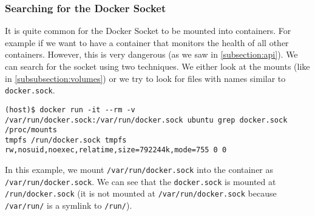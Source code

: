\subsubsection{Searching for the Docker Socket}
It is quite common for the Docker Socket to be mounted into containers. For example if we want to have a container that monitors the health of all other containers. However, this is very dangerous (as we saw in \autoref{subsection:api}). We can search for the socket using two techniques. We either look at the mounts (like in \autoref{subsubsection:volumes}) or we try to look for files with names similar to \lstinline{docker.sock}.

\begin{lstlisting}[caption={\lstinline{docker.sock} in \lstinline{/proc/mounts}.},captionpos=b]
(host)$ docker run -it --rm -v /var/run/docker.sock:/var/run/docker.sock ubuntu grep docker.sock /proc/mounts
tmpfs /run/docker.sock tmpfs rw,nosuid,noexec,relatime,size=792244k,mode=755 0 0
\end{lstlisting}

In this example, we mount \lstinline{/var/run/docker.sock} into the container as \lstinline{/var/run/docker.sock}. We can see that the \lstinline{docker.sock} is mounted at \lstinline{/run/docker.sock} (it is not mounted at \lstinline{/var/run/docker.sock} because \lstinline{/var/run/} is a symlink to \lstinline{/run/}).
